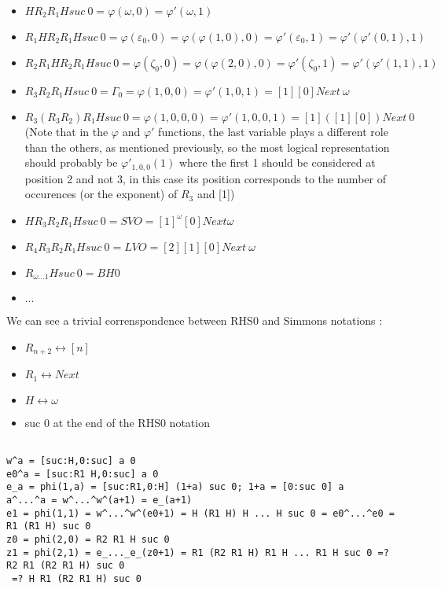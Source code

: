 \documentclass[10pt]{article}
\begin{document}
\begin{itemize}
\item \( H R_2 R_1 H suc\ 0 = \varphi(\omega,0) = \varphi'(\omega,1) \)
\item \( R_1 H R_2 R_1 H suc\ 0 = \varphi(\varepsilon_0,0) = \varphi(\varphi(1,0),0) = \varphi'(\varepsilon_0,1) = \varphi'(\varphi'(0,1),1) \)
\item \( R_2 R_1 H R_2 R_1 H suc\ 0 = \varphi(\zeta_0,0) = \varphi(\varphi(2,0),0) = \varphi'(\zeta_0,1) = \varphi'(\varphi'(1,1),1) \)
\item \( R_3 R_2 R_1 H suc\ 0 = \Gamma_0 = \varphi(1,0,0) = \varphi'(1,0,1) = [1] [0] Next\ \omega \)
\item \( R_3 (R_3 R_2) R_1 H suc\ 0 = \varphi(1,0,0,0) = \varphi'(1,0,0,1) = [1] ([1] [0]) Next\ 0 \) (Note that in the \( \varphi \) and \( \varphi' \) functions, the last variable plays a different role than the others, as mentioned previously, so the most logical representation should probably be \( \varphi'_{1,0,0}(1) \) where the first 1 should be considered at position 2 and not 3, in this case its position corresponds to the number of occurences (or the exponent) of \( R_3 \) and [1])
\item \( H R_3 R_2 R_1 H suc\ 0 = SVO = [1]^\omega [0] Next \omega \)
\item \( R_4 R_3 R_2 R_1 H suc\ 0 = LVO = [2] [1] [0] Next\ \omega \)
\item \( R_{\omega \ldots 1} H suc\ 0 = BH0 \)

\item \( \ldots \)
\end{itemize}

We can see a trivial correnspondence between RHS0 and Simmons notations : 

\begin{itemize}
     \setlength{\itemsep}{1pt}
     \setlength{\parskip}{0pt}
     \setlength{\parsep}{0pt}
\item \( R_{n+2} \leftrightarrow [n] \)
\item \( R_1 \leftrightarrow Next \)
\item \( H \leftrightarrow \omega \)
\item suc 0 at the end of the RHS0 notation
\end{itemize}

\begin{verbatim}

w^a = [suc:H,0:suc] a 0
e0^a = [suc:R1 H,0:suc] a 0
e_a = phi(1,a) = [suc:R1,0:H] (1+a) suc 0; 1+a = [0:suc 0] a
a^...^a = w^...^w^(a+1) = e_(a+1)
e1 = phi(1,1) = w^...^w^(e0+1) = H (R1 H) H ... H suc 0 = e0^...^e0 = R1 (R1 H) suc 0
z0 = phi(2,0) = R2 R1 H suc 0
z1 = phi(2,1) = e_..._e_(z0+1) = R1 (R2 R1 H) R1 H ... R1 H suc 0 =? R2 R1 (R2 R1 H) suc 0 
 =? H R1 (R2 R1 H) suc 0

\end{verbatim}
\end{document}
